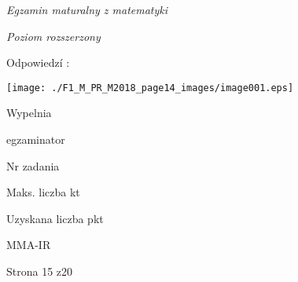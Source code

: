 \documentclass[a4paper,12pt]{article}
\begin{document}
{\it Egzamin maturalny z matematyki}

{\it Poziom rozszerzony}

Odpowiedzí :
\begin{center}
\texttt{[image: ./F1\_M\_PR\_M2018\_page14\_images/image001.eps]}
\end{center}
Wypelnia

egzaminator

Nr zadania

Maks. liczba kt

Uzyskana liczba pkt

MMA-IR

Strona 15 z20
\end{document}
